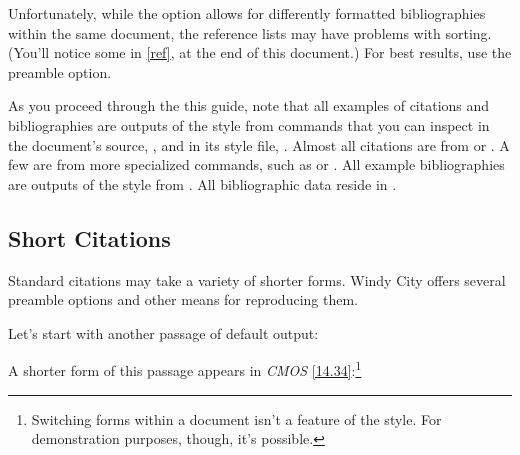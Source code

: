 \documentclass[11pt,letterpaper,oneside]{article}
\begin{document}
Unfortunately, while the  option allows for differently
formatted bibliographies within the same document, the reference lists
may have problems with sorting. (You'll notice some in \ref{ref}, at
the end of this document.) For best results, use the 
preamble option.

As you proceed through the this guide, note that all examples of
citations and bibliographies are outputs of the style from commands
that you can inspect in the document's source, ,
and in its style file, . Almost all citations are
from  or . A few are from more specialized
commands, such as  or . All example
bibliographies are outputs of the style from .
All bibliographic data reside in .

\subsection{Short Citations}
\label{short}

Standard citations may take a variety of shorter forms. Windy City
offers several preamble options and other means for reproducing them.

Let's start with another passage of default output:

\begin{citeonly}
\item \cite[3]{morrison2004a}
\item \cite[18]{morrison2004a}
\item \cite[18]{morrison2004a}
\item \cite[24--26]{morrison2004a}
\item \cite[401-2]{morrison2004b}
\item \cite[433]{morrison2004b}
\item \cite[37--38]{diaz2008}
\item \cite[403]{morrison2004b}
\item \cite[152]{diaz2008}
\item \cite[201-2]{diaz2008}
\item \cites[240]{morrison2004b}[32]{morrison2004a}
\item \cite[33]{morrison2004a}
\end{citeonly}

A shorter form of this passage appears in \textit{CMOS}
\ref{14.34}:\footnote{Switching forms within a document isn't a
feature of the style. For demonstration purposes, though, it's
possible.}
\end{document}
